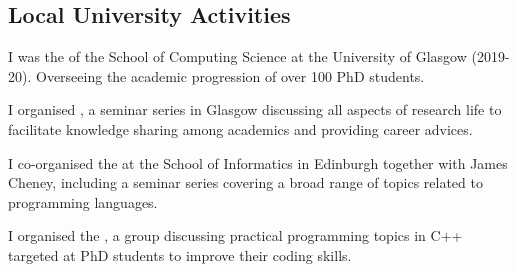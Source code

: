 \subsection{Local University Activities}
\begin{cvitemize}
  \item I was the  of the School of Computing Science at the University of Glasgow ({\small 2019-20}).
        Overseeing the academic progression of over 100 PhD students.
  \item I organised , a seminar series in Glasgow discussing all aspects of research life to facilitate knowledge sharing among academics and providing career advices.
  \item I co-organised the  at the School of Informatics in Edinburgh together with James Cheney, including a seminar series covering a broad range of topics related to programming languages.
  \item I organised the , a group discussing practical programming topics in C++ targeted at PhD students to improve their coding skills.
\end{cvitemize}
